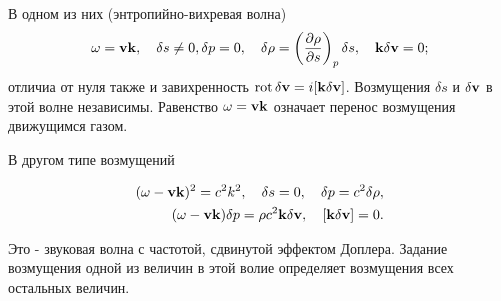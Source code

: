 В одном из них (энтропийно-вихревая волна)
\[
    \omega = \mathbf{vk},
    \quad \delta s \neq 0, \delta p = 0, 
    \quad \delta \rho = \left( \frac{\partial{\rho}}{\partial{s}} \right)_{p} \delta s,
    \quad \mathbf{k} \delta \mathbf{v} = 0;
\]
отличиа от нуля также и завихренность $\mathop{\mathrm{rot}}\nolimits \delta \mathbf{v} = i [\mathbf{k}\delta \mathbf{v}]$.
Возмущения $\delta s$ и $\delta \mathbf{v}$ в этой волне независимы.
Равенство $\omega = \mathbf{vk}$ означает перенос возмущения движущимся газом.

В другом типе возмущений

\begin{eqnarray}
    (\omega - \mathbf{vk})^2 = c^2 k^2, \quad \delta s = 0, \quad \delta p = c^2 \delta \rho,\nonumber \\
    (\omega - \mathbf{vk})\delta p = \rho c^2 \mathbf{k} \delta \mathbf{v}, \quad  [\mathbf{k} \delta \mathbf{v}] = 0. \nonumber
\end{eqnarray}

Это - звуковая волна с частотой, сдвинутой эффектом Доплера.
Задание возмущения одной из величин в этой волие определяет возмущения всех остальных величин.


\begin{comment}



\end{comment}

